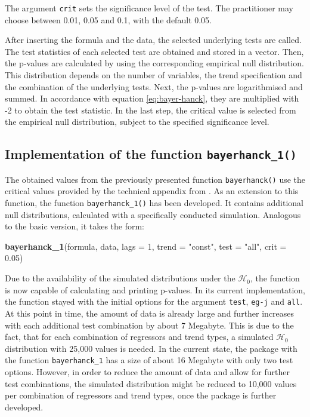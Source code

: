 \documentclass[11pt,a4paper]{article}
\newenvironment{Shaded}{\begin{snugshade}}{\end{snugshade}}
\newcommand{\DataTypeTok}[1]{\textcolor[rgb]{0.13,0.29,0.53}{#1}}
\newcommand{\DecValTok}[1]{\textcolor[rgb]{0.00,0.00,0.81}{#1}}
\newcommand{\FloatTok}[1]{\textcolor[rgb]{0.00,0.00,0.81}{#1}}
\newcommand{\KeywordTok}[1]{\textcolor[rgb]{0.13,0.29,0.53}{\textbf{#1}}}
\newcommand{\NormalTok}[1]{#1}
\newcommand{\StringTok}[1]{\textcolor[rgb]{0.31,0.60,0.02}{#1}}
\begin{document}
The argument \texttt{crit} sets the significance level of the test. The
practitioner may choose between 0.01, 0.05 and 0.1, with the default
0.05.

After inserting the formula and the data, the selected underlying tests
are called. The test statistics of each selected test are obtained and
stored in a vector. Then, the p-values are calculated by using the
corresponding empirical null distribution. This distribution depends on
the number of variables, the trend specification and the combination of
the underlying tests. Next, the p-values are logarithmised and summed.
In accordance with equation \eqref{eq:bayer-hanck}, they are multiplied
with -2 to obtain the test statistic. In the last step, the critical
value is selected from the empirical null distribution, subject to the
specified significance level.

\hypertarget{implementation-of-the-function-bayerhanck_1}{%
\subsection{\texorpdfstring{Implementation of the function
\texttt{bayerhanck\_1()}}{Implementation of the function bayerhanck\_1()}}\label{implementation-of-the-function-bayerhanck_1}}

The obtained values from the previously presented function
\texttt{bayerhanck()} use the critical values provided by the technical
appendix from \textcite{Bayerhanck2009}. As an extension to this
function, the function \texttt{bayerhanck\_1()} has been developed. It
contains additional null distributions, calculated with a specifically
conducted simulation. Analogous to the basic version, it takes the form:

\begin{Shaded}
\begin{Highlighting}[]
\KeywordTok{bayerhanck_1}\NormalTok{(formula, data, }\DataTypeTok{lags =} \DecValTok{1}\NormalTok{, }\DataTypeTok{trend =} \StringTok{"const"}\NormalTok{, }
           \DataTypeTok{test =} \StringTok{"all"}\NormalTok{, }\DataTypeTok{crit =} \FloatTok{0.05}\NormalTok{)}
\end{Highlighting}
\end{Shaded}

Due to the availability of the simulated distributions under the
\(\mathcal{H}_0\), the function is now capable of calculating and
printing p-values. In its current implementation, the function stayed
with the initial options for the argument \texttt{test}, \texttt{eg-j}
and \texttt{all}. At this point in time, the amount of data is already
large and further increases with each additional test combination by
about 7 Megabyte. This is due to the fact, that for each combination of
regressors and trend types, a simulated \(\mathcal{H}_0\) distribution
with 25,000 values is needed. In the current state, the package with the
function \texttt{bayerhanck\_1} has a size of about 16 Megabyte with
only two test options. However, in order to reduce the amount of data
and allow for further test combinations, the simulated distribution
might be reduced to 10,000 values per combination of regressors and
trend types, once the package is further developed.
\end{document}
